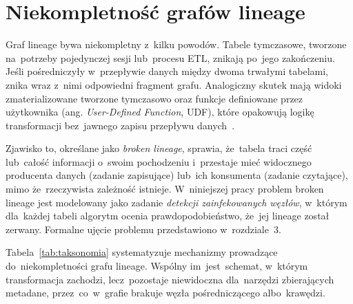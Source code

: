 \documentclass[polish,master,a4paper,oneside]{ppfcmthesis}
\renewcommand{\_}{\origtextunderscore\ifmmode\else\allowbreak\fi}
\begin{document}
\section{Niekompletność grafów lineage}
\label{sec:broken_lineage}

Graf lineage bywa niekompletny z~kilku powodów. Tabele tymczasowe,
tworzone na~potrzeby pojedynczej sesji lub~procesu ETL, znikają po~jego
zakończeniu. Jeśli pośredniczyły w~przepływie danych między dwoma trwałymi
tabelami, znika wraz z~nimi odpowiedni fragment grafu. Analogiczny skutek
mają widoki zmaterializowane tworzone tymczasowo oraz funkcje definiowane
przez użytkownika (ang. \emph{User-Defined Function}, UDF), które opakowują
logikę transformacji bez~jawnego zapisu przepływu danych~\cite{Yamada2023}.

Zjawisko to, określane jako \emph{broken lineage}, sprawia, że~tabela
traci część lub~całość informacji o~swoim pochodzeniu i~przestaje mieć
widocznego producenta danych (zadanie zapisujące) lub~ich
konsumenta (zadanie czytające), mimo że~rzeczywista zależność istnieje.
W~niniejszej pracy problem broken lineage jest modelowany jako zadanie
\emph{detekcji zainfekowanych węzłów}, w~którym dla~każdej tabeli algorytm ocenia
prawdopodobieństwo, że~jej lineage został zerwany. Formalne ujęcie problemu
przedstawiono w~rozdziale~3.

Tabela~\ref{tab:taksonomia} systematyzuje mechanizmy prowadzące
do~niekompletności grafu lineage. Wspólny im~jest~schemat, w~którym transformacja
zachodzi, lecz~pozostaje niewidoczna dla~narzędzi zbierających metadane,
przez~co~w~grafie brakuje węzła pośredniczącego albo~krawędzi.
\end{document}
